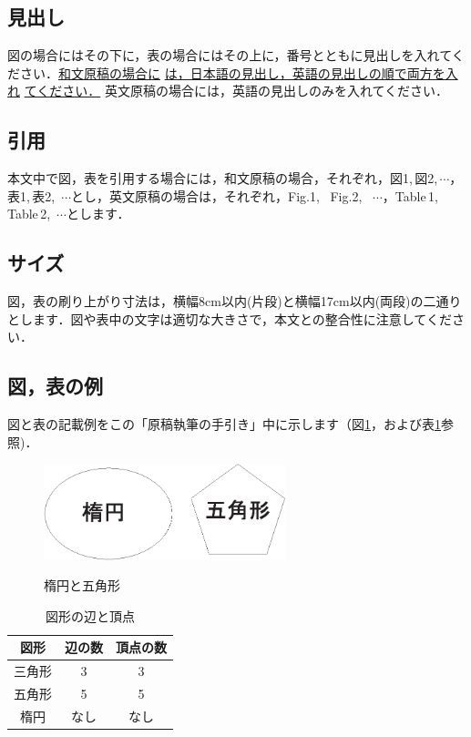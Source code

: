 \documentclass{hisken}
\begin{document}
\subsection{見出し}
図の場合にはその下に，表の場合にはその上に，番号とともに見出しを入れてください．{\underline{和文原稿の場合に} \underline{は，日本語の見出し，英語の見出しの順で両方を入れ} \underline{てください．}} 英文原稿の場合には，英語の見出しのみを入れてください．

\subsection{引用}
本文中で図，表を引用する場合には，和文原稿の場合，それぞれ，図1,\,図2,\,$ \cdots $，表1,\,表2,\, $ \cdots $とし，英文原稿の場合は，それぞれ，Fig.1, \, Fig.2, \, $ \cdots $，Table\,1,\,Table\,2,\, $ \cdots $とします．

\subsection{サイズ}
図，表の刷り上がり寸法は，横幅8cm以内(片段)と横幅17cm以内(両段)の二通りとします．図や表中の文字は適切な大きさで，本文との整合性に注意してください．

\subsection{図，表の例}
図と表の記載例をこの「原稿執筆の手引き」中に示します（図\ref{fig:example1}，および表\ref{table:example2}参照)．

\begin{figure}[tb]
	\begin{center}
    \includegraphics[width=70mm]{fig1.eps}
	\caption{楕円と五角形}		%
	\label{fig:example1}
	\end{center}
\end{figure}

\begin{table}[t]
	\begin{center}
	\caption{図形の辺と頂点}		%
	\label{table:example2}
	\begin{tabular}[hbt]{c c c}
	\hline
	\bf 図形 & \bf 辺の数 & \bf 頂点の数\\
	\hline
	三角形 & 3 & 3\\
	五角形 & 5 & 5\\
	楕円 & なし & なし\\
	\hline
	\end{tabular}
	\end{center}
\end{table}
\end{document}
